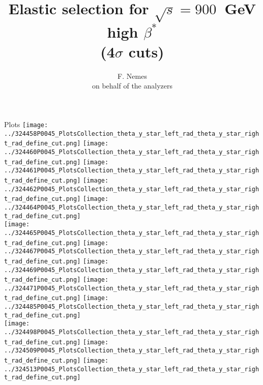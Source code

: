 \documentclass{beamer}
\title[TOTEM Physics Analysis meeting, 900 GeV high-$\beta^{*}$ for CNI analysis]{\scriptsize Elastic selection for $\sqrt{s}=900$~GeV high $\beta^{*}$\\ (4$\sigma$ cuts)}
\author{F. Nemes\\\vspace{1mm} \tiny on behalf of the analyzers}
\begin{document}
\begin{frame}
        \titlepage
\end{frame}

\begin{frame}\tiny
        \begin{block}{Plots}
		  \centering
                \texttt{[image: ../324458P0045\_PlotsCollection\_theta\_y\_star\_left\_rad\_theta\_y\_star\_right\_rad\_define\_cut.png]}
                \texttt{[image: ../324460P0045\_PlotsCollection\_theta\_y\_star\_left\_rad\_theta\_y\_star\_right\_rad\_define\_cut.png]}
                \texttt{[image: ../324461P0045\_PlotsCollection\_theta\_y\_star\_left\_rad\_theta\_y\_star\_right\_rad\_define\_cut.png]}
                \texttt{[image: ../324462P0045\_PlotsCollection\_theta\_y\_star\_left\_rad\_theta\_y\_star\_right\_rad\_define\_cut.png]}
                \texttt{[image: ../324464P0045\_PlotsCollection\_theta\_y\_star\_left\_rad\_theta\_y\_star\_right\_rad\_define\_cut.png]}\\
                \texttt{[image: ../324465P0045\_PlotsCollection\_theta\_y\_star\_left\_rad\_theta\_y\_star\_right\_rad\_define\_cut.png]}
                \texttt{[image: ../324467P0045\_PlotsCollection\_theta\_y\_star\_left\_rad\_theta\_y\_star\_right\_rad\_define\_cut.png]}
                \texttt{[image: ../324469P0045\_PlotsCollection\_theta\_y\_star\_left\_rad\_theta\_y\_star\_right\_rad\_define\_cut.png]}
                \texttt{[image: ../324471P0045\_PlotsCollection\_theta\_y\_star\_left\_rad\_theta\_y\_star\_right\_rad\_define\_cut.png]}
                \texttt{[image: ../324485P0045\_PlotsCollection\_theta\_y\_star\_left\_rad\_theta\_y\_star\_right\_rad\_define\_cut.png]}\\
                \texttt{[image: ../324498P0045\_PlotsCollection\_theta\_y\_star\_left\_rad\_theta\_y\_star\_right\_rad\_define\_cut.png]}
                \texttt{[image: ../324509P0045\_PlotsCollection\_theta\_y\_star\_left\_rad\_theta\_y\_star\_right\_rad\_define\_cut.png]}
                \texttt{[image: ../324513P0045\_PlotsCollection\_theta\_y\_star\_left\_rad\_theta\_y\_star\_right\_rad\_define\_cut.png]}

\end{block}
\end{frame}
\end{document}
